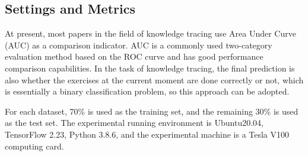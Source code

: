 \subsection{Settings and Metrics}
At present, most papers in the field of knowledge tracing use Area Under Curve (AUC) as a comparison indicator. AUC is a commonly used two-category evaluation method based on the ROC curve and has good performance comparison capabilities. In the task of knowledge tracing, the final prediction is also whether the exercises at the current moment are done correctly or not, which is essentially a binary classification problem, so this approach can be adopted.

For each dataset, 70\% is used as the training set, and the remaining 30\% is used as the test set. The experimental running environment is Ubuntu20.04, TensorFlow 2.23, Python 3.8.6, and the experimental machine is a Tesla V100 computing card.

